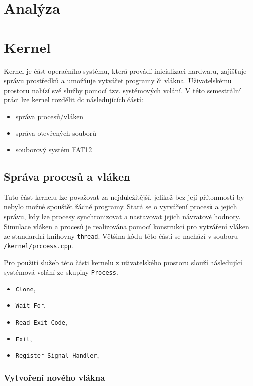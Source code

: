\documentclass[12pt, a4paper]{article}
\let\oldsection\section
\renewcommand\section{\clearpage\oldsection}
\begin{document}
    \tableofcontents
    \pagebreak

    
    \section{Analýza}

    \section{Kernel}

    Kernel je část operačního systému, která provádí inicializaci hardwaru, zajišťuje správu prostředků a umožňuje vytvářet programy či vlákna. Uživatelskému prostoru nabízí své služby pomocí tzv. systémových volání. V této semestrální práci lze kernel rozdělit do následujících částí: 
\begin{itemize}
    \item správa procesů/vláken
    \item správa otevřených souborů
    \item souborový systém FAT12
\end{itemize}

\subsection{Správa procesů a vláken}
Tuto část kernelu lze považovat za nejdůležitější, jelikož bez její přítomnosti by nebylo možné spouštět žádné programy. Stará se o vytváření procesů a jejich správu, kdy lze procesy synchronizovat a nastavovat jejich návratové hodnoty. Simulace vláken a procesů je realizována pomocí konstrukcí pro vytváření vláken ze standardní knihovny \texttt{thread}. Většina kódu této části se nachází v souboru \texttt{/kernel/process.cpp}.

Pro použití služeb této části kernelu z uživatelského prostoru slouží následující systémová volání ze skupiny \texttt{Process}.

\begin{itemize}
    \item \texttt{Clone},
    \item \texttt{Wait\_For},
    \item \texttt{Read\_Exit\_Code},
    \item \texttt{Exit},
    \item \texttt{Register\_Signal\_Handler},
\end{itemize}

\subsubsection{Vytvoření nového vlákna}
\end{document}

